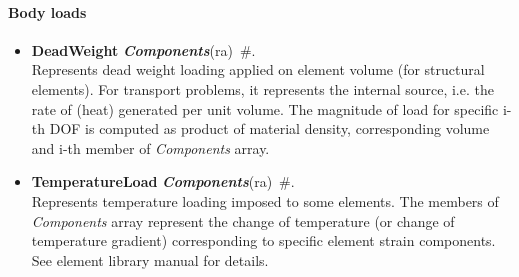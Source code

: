 \documentclass[draft]{article}
\newcommand{\param}[1]{{\em #1}}
\newcommand{\keywordnotype}[1]{\mbox{{\it{\bf{#1}}}}}
\newcommand{\keyword}[2]{\mbox{{\keywordnotype{#1}\tiny (#2)}}}
\newcommand{\entKeywordInst}[1]{\mbox{{\bf{{#1}}}}}
\newcommand{\field}[2]{\mbox{\keyword{#1}{#2}~\#}}
\begin{document}
\paragraph{Body loads}
\begin{itemize}
\item \entKeywordInst{DeadWeight} \field{Components}{ra}.\\
Represents dead weight loading applied on element volume (for
structural elements). For transport problems, it represents the
internal source, i.e. the rate of (heat) generated per unit volume. 
The magnitude of load for specific i-th DOF is computed as product of material density,
corresponding volume and i-th member of \param{Components} array.
\item \entKeywordInst{TemperatureLoad}
\field{Components}{ra}.\\
Represents temperature loading imposed to some elements. The members of
\param{Components} array represent the change of temperature (or change
of temperature gradient) corresponding to
specific element strain components. See element library manual for details.
\end{itemize}
\end{document}
